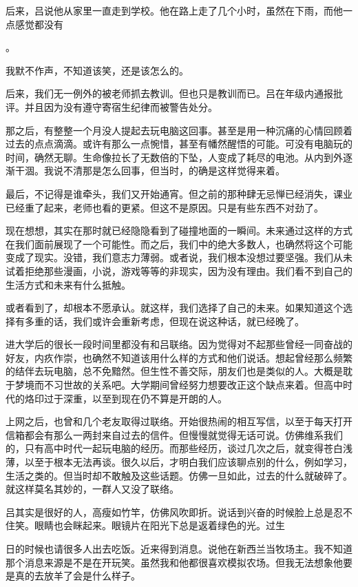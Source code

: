 \documentclass{article}
\begin{document}
后来，吕说他从家里一直走到学校。他在路上走了几个小时，虽然在下雨，而他一点感觉都没有

\newpage 

。

我默不作声，不知道该笑，还是该怎么的。

后来，我们无一例外的被老师抓去教训。但也只是教训而已。吕在年级内通报批评。并且因为没有遵守寄宿生纪律而被警告处分。

那之后，有整整一个月没人提起去玩电脑这回事。甚至是用一种沉痛的心情回顾着过去的点点滴滴。或许有那么一点惋惜，甚至有幡然醒悟的可能。可没有电脑玩的时间，确然无聊。生命像拉长了无数倍的下坠，人变成了耗尽的电池。从内到外逐渐干涸。我说不清那是怎么回事，但当时，的确是这样觉得来着。

最后，不记得是谁牵头，我们又开始通宵。但之前的那种肆无忌惮已经消失，课业已经重了起来，老师也看的更紧。但这不是原因。只是有些东西不对劲了。

现在想想，其实在那时就已经隐隐看到了碰撞地面的一瞬间。未来通过这样的方式在我们面前展现了一个可能性。而之后，我们中的绝大多数人，也确然将这个可能变成了现实。没错，我们意志力薄弱。或者说，我们根本没想过要坚强。我们从未试着拒绝那些漫画，小说，游戏等等的非现实，因为没有理由。我们看不到自己的生活方式和未来有什么抵触。

\newpage 

或者看到了，却根本不愿承认。就这样，我们选择了自己的未来。如果知道这个选择有多重的话，我们或许会重新考虑，但现在说这种话，就已经晚了。


进大学后的很长一段时间里都没有和吕联络。因为觉得对不起那些曾经一同奋战的好友，内疚作崇，也确然不知道该用什么样的方式和他们说话。想起曾经那么频繁的结伴去玩电脑，总不免黯然。但生性不善交际，朋友们也是类似的人。大概是耽于梦境而不习世故的关系吧。大学期间曾经努力想要改正这个缺点来着。但高中时代的烙印过于深重，以至到现在仍不算是开朗的人。

上网之后，也曾和几个老友取得过联络。开始很热闹的相互写信，以至于每天打开信箱都会有那么一两封来自过去的信件。但慢慢就觉得无话可说。仿佛维系我们的，只有高中时代一起玩电脑的经历。而那些经历，谈过几次之后，就变得苍白浅薄，以至于根本无法再谈。很久以后，才明白我们应该聊点别的什么，例如学习，生活之类的。但当时却不敢触及这些话题。仿佛一旦如此，过去的什么就破碎了。就这样莫名其妙的，一群人又没了联络。

吕其实是很好的人，高瘦如竹竿，仿佛风吹即折。说话到兴奋的时候脸上总是忍不住笑。眼睛也会眯起来。眼镜片在阳光下总是返着绿色的光。过生

\newpage 

日的时候也请很多人出去吃饭。近来得到消息。说他在新西兰当牧场主。我不知道那个消息来源是不是在开玩笑。虽然我和他都很喜欢模拟农场。但我无法想象他要是真的去放羊了会是什么样子。
\end{document}
